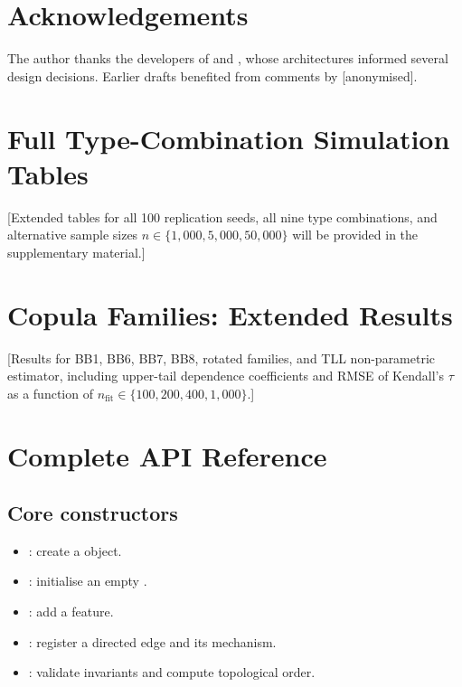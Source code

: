 \documentclass[article]{jss}
\begin{document}
\section*{Acknowledgements}
The author thanks the developers of  \citep{nagler2022rvinecopulib}
and  \citep{sofrygin2017simcausal}, whose architectures informed
several design decisions. Earlier drafts benefited from comments by [anonymised].




\appendix

\section{Full Type-Combination Simulation Tables}
\label{app:type_sims}

[Extended tables for all 100 replication seeds, all nine type combinations,
and alternative sample sizes $n \in \{1{,}000, 5{,}000, 50{,}000\}$ will be
provided in the supplementary material.]

\section{Copula Families: Extended Results}
\label{app:copula_sims}

[Results for BB1, BB6, BB7, BB8, rotated families, and TLL non-parametric
estimator, including upper-tail dependence coefficients and RMSE of Kendall's
$\tau$ as a function of $n_\text{fit} \in \{100, 200, 400, 1{,}000\}$.]

\section{Complete  API Reference}
\label{app:api}

\subsection{Core constructors}
\begin{itemize}[leftmargin=2em]
  \item {}: create a
         object.
  \item {}\code{()}: initialise an empty .
  \item {}: add a feature.
  \item {}: register
        a directed edge and its mechanism.
  \item {}: validate invariants and compute
        topological order.
\end{itemize}
\end{document}
